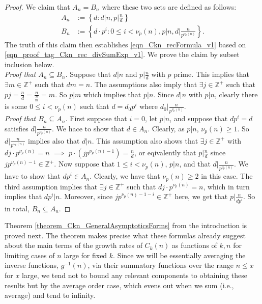 \documentclass[11pt,reqno,a4letter]{article}
\numberwithin{figure}{section}
\numberwithin{table}{section}
\theoremstyle{plain}
\numberwithin{theorem}{section}
\theoremstyle{definition}
\begin{document}
\begin{proof}
We claim that $A_n = B_n$ where these two sets are defined as follows: 
\begin{align*} 
A_n & := \left\{d: d|n, p|\frac{n}{d}\right\} \\ 
B_n & := \left\{d \cdot p^i: 0 \leq i < \nu_p(n), p|n, d \bigr\rvert \frac{n}{p^{\nu_p(n)}} \right\}. 
\end{align*} 
The truth of this claim then establishes \eqref{eqn_Ckn_recFormula_v1} based on 
\eqref{eqn_proof_tag_Ckn_rec_divSumExp_v1}. We prove the claim by subset inclusion below. \\ 
\textit{Proof that $A_n \subseteq B_n$. } 
Suppose that $d|n$ and $p|\frac{n}{d}$ with $p$ prime. This implies that 
$\exists m \in \mathbb{Z}^{+}$ such that $dm=n$. The assumptions also imply that 
$\exists j \in \mathbb{Z}^{+}$ such that $pj = \frac{n}{d} = \frac{n}{\frac{n}{m}} = m$. 
So $p|m$ which implies that $p|n$. Since $d|n$ with $p|n$, clearly there is some $0 \leq i < \nu_p(n)$ 
such that $d = d_0p^i$ where $d_0 \bigr\rvert \frac{n}{p^{\nu_p(n)}}$. \\ 
\textit{Proof that $B_n \subseteq A_n$. } 
First suppose that $i = 0$, let $p|n$, and suppose that $dp^{i} = d$ satisfies 
$d \bigr\rvert \frac{n}{p^{\nu_p(n)}}$. We hace to show that $d \in A_n$. Clearly, as $p|n$, $\nu_p(n) \geq 1$. 
So $d \bigr\rvert \frac{n}{p^{\nu_p(n)}}$ implies also that $d|n$. This assumption also shows that 
$\exists j \in \mathbb{Z}^{+}$ with $dj \cdot p^{\nu_p(n)} = n$ $\implies$ 
$p \cdot \left(j p^{\nu_p(n)-1}\right) = \frac{n}{d}$, or eqivalently that $p | \frac{n}{d}$ since 
$j p^{\nu_p(n)-1} \in \mathbb{Z}^{+}$. 
Now suppose that $1 \leq i < \nu_p(n)$, $p|n$, and that $d \bigr\rvert \frac{n}{p^{\nu_p(n)}}$. 
We have to show that $dp^{i} \in A_n$. Clearly, we have that $\nu_p(n) \geq 2$ in this case. 
The third assumption implies that $\exists j \in \mathbb{Z}^{+}$ such that $dj \cdot p^{\nu_p(n)} = n$, 
which in turn implies that $dp^{i} | n$. Moreover, since 
$j p^{\nu_p(n) - 1 - i} \in \mathbb{Z}^{+}$ here, 
we get that $p \bigr\rvert \frac{n}{dp^i}$. So in total, $B_n \subseteq A_n$. 
\end{proof} 

Theorem \ref{theorem_Ckn_GeneralAsymptoticsForms} from the introduction is proved next. 
The theorem makes precise what these formulas already 
suggest about the main terms of the growth rates of 
$C_k(n)$ as functions of $k,n$ for limiting cases of $n$ large for fixed $k$. 
Since we will be essentially averaging the inverse functions, $g^{-1}(n)$, via their summatory functions 
over the range $n \leq x$ for $x$ large, we tend not to bound any relevant components to obtaining 
these results but by the 
average order case, which evens out when we sum (i.e., average) and tend to infinity. 
\end{document}
